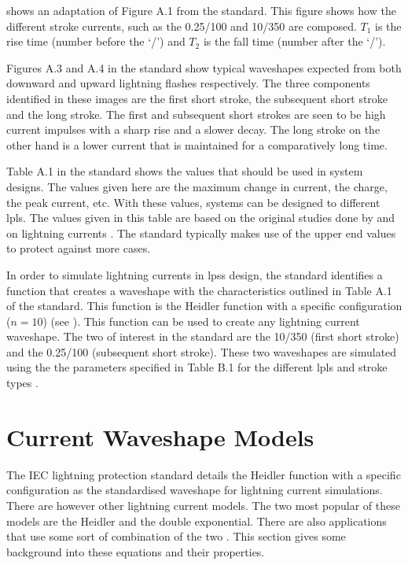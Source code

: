  shows an adaptation of Figure A.1 from the standard. This figure shows how the different stroke currents, such as the 0.25/100 and 10/350 are composed. $T_1$ is the rise time (number before the `/') and $T_2$ is the fall time (number after the `/').

Figures A.3 and A.4 in the standard show typical waveshapes expected from both downward and upward lightning flashes respectively. The three components identified in these images are the first short stroke, the subsequent short stroke and the long stroke. The first and subsequent short strokes are seen to be high current impulses with a sharp rise and a slower decay. The long stroke on the other hand is a lower current that is maintained for a comparatively long time.

Table A.1 in the standard shows the values that should be used in system designs. The values given here are the maximum change in current, the charge, the peak current, etc. With these values, systems can be designed to different \glspl{lpl}. The values given in this table are based on the original studies done by \citeauthor{Anderson1980} and \citeauthor{Berger1975} on lightning currents \cite{Anderson1980,Berger1975}. The standard typically makes use of the upper end values to protect against more cases.

In order to simulate lightning currents in \glspl{lps} design, the standard identifies a function that creates a waveshape with the characteristics outlined in Table A.1 of the standard. This function is the Heidler function with a specific configuration ($n = 10$) (see ). This function can be used to create any lightning current waveshape. The two of interest in the standard are the 10/350 (first short stroke) and the 0.25/100 (subsequent short stroke). These two waveshapes are simulated using the the parameters specified in Table B.1 for the different \glspl{lpl} and stroke types \cite{IEC623051}.


\section{Current Waveshape Models}
\label{sec:background_current_waveshape_models}
The IEC lightning protection standard details the Heidler function with a specific configuration as the standardised waveshape for lightning current simulations. There are however other lightning current models. The two most popular of these models are the Heidler and the double exponential. There are also applications that use some sort of combination of the two \cite{Javor2011,Nucci2003,Pavanello2007}. This section gives some background into these equations and their properties.

